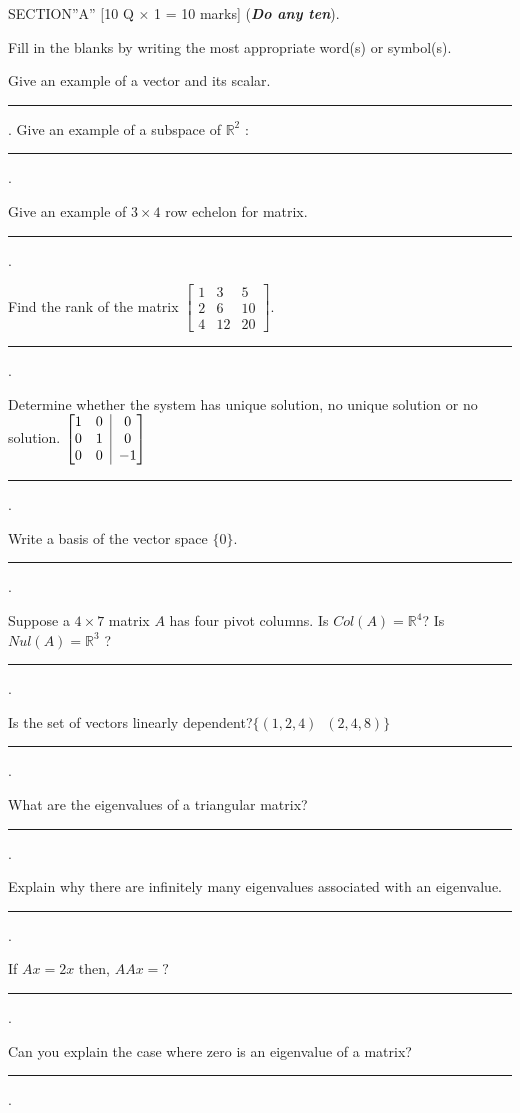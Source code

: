\documentclass[12pt]{exam}
\begin{document}
\begin{center}
  SECTION''A'' \hspace{5mm} [10 Q \(\times\) 1 = 10 marks] (\textbf{\textit{Do any ten}}).
\end{center}
Fill in the blanks by writing the most appropriate word(s) or symbol(s).
\begin{questions}
\question Give an example of a vector and its scalar. \rule{7cm}{0.15mm}.
\question Give an example of a subspace of $\mathbb{R}^2$ : \rule{8cm}{0.15mm}.

\question Give an example of $3 \times 4 $ row echelon for matrix. \rule{7cm}{0.15mm}.

\question Find the rank of the matrix $\displaystyle \begin{bmatrix}
    1 & 3 & 5 \\
    2 & 6 & 10 \\
    4  & 12 & 20
\end{bmatrix}.$ \rule{7cm}{0.15mm}.

\question Determine whether the system has unique solution, no unique solution or no solution. $ \left[ \begin{matrix}
    1 & 0  \\
    0 & 1  \\
    0 & 0
\end{matrix} \;\; \vline \;\;
\begin{matrix}
    0\\ 0\\ -1
\end{matrix} \right]$ \rule{7cm}{0.15mm}.

\question Write a basis of the vector space $\{0\}$. \rule{7cm}{0.15mm}.

\question Suppose a $4 \times 7$ matrix $A$ has four pivot columns. Is $Col(A) = \mathbb{R}^4$? Is $Nul(A) = \mathbb{R}^3$ ? \rule{12cm}{0.15mm}.

\question Is the set of vectors linearly dependent?$\{(1,2, 4) \;\; (2,4,8)\}$ \rule{4cm}{0.15mm}.

\question What are the eigenvalues of a triangular matrix? \rule{7cm}{0.15mm}.

\question Explain why there are infinitely many eigenvalues associated with an eigenvalue.\\[1mm]
  \rule{12cm}{0.15mm}.

\question If $Ax=2x$ then, $AAx=?$ \rule{7cm}{0.15mm}.

\question Can you explain the case where zero is an eigenvalue of a matrix? \\[1mm] \rule{12cm}{0.15mm}.
\end{questions}
\end{document}
